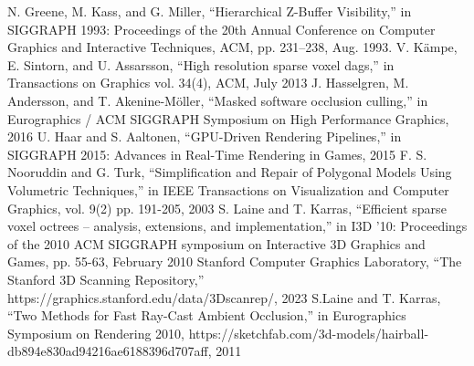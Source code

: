 \documentclass[conference]{IEEEtran}
\begin{document}
\begin{acronym}[SPS] %

\end{acronym}

\begin{thebibliography}{00}
 N. Greene, M. Kass, and G. Miller, ``Hierarchical Z-Buffer Visibility,'' in SIGGRAPH 1993: Proceedings of the 20th Annual Conference on Computer Graphics and Interactive Techniques, ACM, pp. 231–238, Aug. 1993.
 V. Kämpe, E. Sintorn, and U. Assarsson, ``High resolution sparse voxel dags,'' in Transactions on Graphics vol. 34(4), ACM, July 2013
 J. Hasselgren, M. Andersson, and T. Akenine-Möller, ``Masked software occlusion culling,'' in Eurographics / ACM SIGGRAPH Symposium on High Performance Graphics, 2016
 U. Haar and S. Aaltonen, ``GPU-Driven Rendering Pipelines,'' in SIGGRAPH 2015: Advances in Real-Time Rendering in Games, 2015
 F. S. Nooruddin and G. Turk, ``Simplification and Repair of Polygonal Models Using Volumetric Techniques,'' in IEEE Transactions on Visualization and Computer Graphics, vol. 9(2) pp. 191-205, 2003
 S. Laine and T. Karras, ``Efficient sparse voxel octrees – analysis, extensions, and implementation,'' in I3D '10: Proceedings of the 2010 ACM SIGGRAPH symposium on Interactive 3D Graphics and Games, pp. 55-63, February 2010
 Stanford Computer Graphics Laboratory, ``The Stanford 3D Scanning Repository,'' https://graphics.stanford.edu/data/3Dscanrep/, 2023
 S.Laine and T. Karras, ``Two Methods for Fast Ray-Cast Ambient Occlusion,'' in Eurographics Symposium on Rendering 2010,  https://sketchfab.com/3d-models/hairball-db894e830ad94216ae6188396d707aff, 2011
\end{thebibliography}
\vspace{12pt}
\end{document}
